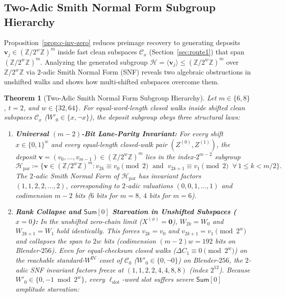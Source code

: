\documentclass[11pt,a4paper]{article}
\newtheorem{theorem}{Theorem}
\theoremstyle{definition}
\theoremstyle{remark}
\newcommand{\Zmod}[1]{\mathbb{Z}/2^{#1}\mathbb{Z}}
\newcommand{\SumAcc}{\mathsf{Sum}}
\newcommand{\Hpar}{\mathcal{H}_{\mathrm{par}}}
\begin{document}
\subsection{Two-Adic Smith Normal Form Subgroup Hierarchy}
\label{subsec:snf-hierarchy}
Proposition~\ref{prop:c-inv-zero} reduces preimage recovery to generating deposits $\mathbf{v}_j \in (\Zmod{w})^m$ inside fast clean subspaces $\mathcal{C}_x$ (Section~\ref{sec:route1}) that span $(\Zmod{w})^m$. Analyzing the generated subgroup $\mathcal{H} = \langle \mathbf{v}_j \rangle \le (\Zmod{w})^m$ over $\Zmod{w}$ via $2$-adic Smith Normal Form (SNF) reveals two algebraic obstructions in unshifted walks and shows how multi-shifted subspaces overcome them.

\begin{theorem}[Two-Adic Smith Normal Form Subgroup Hierarchy]
\label{thm:snf-hierarchy}
Let $m \in \{6, 8\}$, $t = 2$, and $w \in \{32, 64\}$. For equal-word-length closed walks inside shifted clean subspaces $\mathcal{C}_x$ ($W'_0 \in \{x, \neg x\}$), the deposit subgroup obeys three structural laws:
\begin{enumerate}[leftmargin=2em]
    \item \textbf{Universal $(m - 2)$-Bit Lane-Parity Invariant:} For every shift $x \in \{0,1\}^w$ and every equal-length closed-walk pair $(Z^{(0)}, Z^{(1)})$, the deposit $\mathbf{v} = (v_0, \dots, v_{m-1}) \in (\Zmod{w})^m$ lies in the index-$2^{m-2}$ subgroup
    \begin{equation}
        \Hpar \coloneqq \bigl\{\mathbf{v} \in (\Zmod{w})^m : v_{2k} \equiv v_0 \!\!\pmod 2 \;\text{ and }\; v_{2k+1} \equiv v_1 \!\!\pmod 2 \;\;\forall\, 1 \le k < m/2\bigr\}.
        \label{eq:hpar}
    \end{equation}
    The $2$-adic Smith Normal Form of $\Hpar$ has invariant factors $(1, 1, 2, 2, \dots, 2)$, corresponding to $2$-adic valuations $(0, 0, 1, \dots, 1)$ and codimension $m - 2$ bits ($6$ bits for $m=8$, $4$ bits for $m=6$).
    \item \textbf{Rank Collapse and $\SumAcc[0]$ Starvation in Unshifted Subspaces ($x = 0$):} In the unshifted zero-chain limit ($X^{(\phi)} = \mathbf{0}$), $W_{2k} = W_0$ and $W_{2k+1} = W_1$ hold identically. This forces $v_{2k} = v_0$ and $v_{2k+1} = v_1 \pmod{2^w}$ and collapses the span to $2w$ bits (codimension $(m-2)w = 192$ bits on Blender-$256$). Even for equal-checksum closed walks ($\Delta C_1 \equiv 0 \pmod{2^w}$) on the reachable standard-$W^{\mathrm{IV}}$ coset of $\mathcal{C}_0$ ($W'_0 \in \{0, \neg 0\}$) on Blender-$256$, the $2$-adic SNF invariant factors freeze at $(1, 1, 2, 2, 4, 4, 8, 8)$ (index $2^{12}$). Because $W'_0 \in \{0, -1 \bmod 2^w\}$, every $\ell_{\mathrm{slot}}$-word slot suffers severe $\SumAcc[0]$ amplitude starvation:

\end{enumerate}
\end{theorem}
\end{document}
